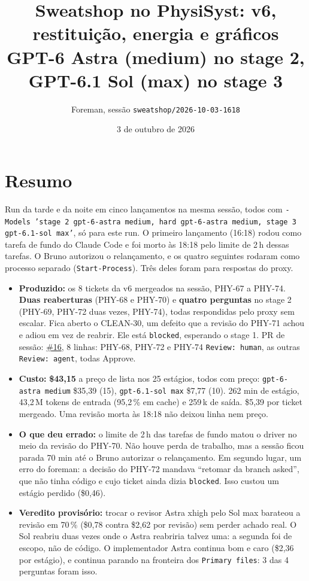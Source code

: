 \documentclass[11pt,a4paper]{article}
\title{Sweatshop no PhysiSyst: v6, restituição, energia e gráficos\\\large GPT-6 Astra (medium) no stage 2, GPT-6.1 Sol (max) no stage 3}
\author{Foreman, sessão \texttt{sweatshop/2026-10-03-1618}}
\date{3 de outubro de 2026}
\begin{document}
\maketitle

\section*{Resumo}

Run da tarde e da noite em cinco lançamentos na mesma sessão, todos com
\texttt{-Models 'stage 2 gpt-6-astra medium, hard gpt-6-astra medium, stage 3
gpt-6.1-sol max'}, só para este run. O primeiro lançamento (16:18) rodou como
tarefa de fundo do Claude Code e foi morto às 18:18 pelo limite de 2\,h dessas
tarefas. O Bruno autorizou o relançamento, e os quatro seguintes rodaram como
processo separado (\texttt{Start-Process}). Três deles foram para respostas do
proxy.

\begin{itemize}
  \item \textbf{Produzido:} os 8 tickets da v6 mergeados na sessão, PHY-67 a
        PHY-74. \textbf{Duas reaberturas} (PHY-68 e PHY-70) e \textbf{quatro
        perguntas} no stage 2 (PHY-69, PHY-72 duas vezes, PHY-74), todas
        respondidas pelo proxy sem escalar. Fica aberto o CLEAN-30, um defeito
        que a revisão do PHY-71 achou e adiou em vez de reabrir. Ele está
        \texttt{blocked}, esperando o stage 1. PR de sessão:
        \href{https://github.com/Laginho/PhysiSyst/pull/16}{\#16}, 8 linhas:
        PHY-68, PHY-72 e PHY-74 \texttt{Review: human}, as outras
        \texttt{Review: agent}, todas Approve.
  \item \textbf{Custo:} \textbf{\$43,15} a preço de lista nos 25 estágios,
        todos com preço: \texttt{gpt-6-astra medium} \$35,39 (15),
        \texttt{gpt-6.1-sol max} \$7,77 (10). 262 min de estágio, 43,2\,M
        tokens de entrada (95,2\,\% em cache) e 259\,k de saída. \$5,39 por
        ticket mergeado. Uma revisão morta às 18:18 não deixou linha nem preço.
  \item \textbf{O que deu errado:} o limite de 2\,h das tarefas de fundo
        matou o driver no meio da revisão do PHY-70. Não houve perda de
        trabalho, mas a sessão ficou parada 70 min até o Bruno autorizar o
        relançamento. Em segundo lugar, um erro do foreman: a decisão do PHY-72
        mandava ``retomar da branch asked'', que não tinha código e cujo ticket
        ainda dizia \texttt{blocked}. Isso custou um estágio perdido (\$0,46).
  \item \textbf{Veredito provisório:} trocar o revisor Astra xhigh pelo Sol
        max barateou a revisão em 70\,\% (\$0,78 contra \$2,62 por revisão)
        sem perder achado real. O Sol reabriu duas vezes onde o Astra reabriria
        talvez uma: a segunda foi de escopo, não de código. O implementador
        Astra continua bom e caro (\$2,36 por estágio), e continua parando na
        fronteira dos \texttt{Primary files}: 3 das 4 perguntas foram isso.
\end{itemize}
\end{document}
